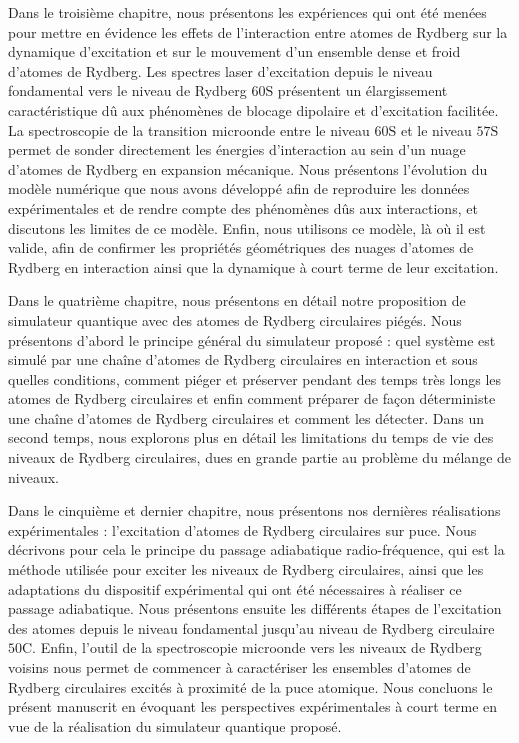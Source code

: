 Dans le troisième chapitre, nous présentons les expériences qui ont été menées pour mettre en évidence les effets de l'interaction entre atomes de Rydberg sur la dynamique d'excitation et sur le mouvement d'un ensemble dense et froid d'atomes de Rydberg.
Les spectres laser d'excitation depuis le niveau fondamental vers le niveau de Rydberg $\mathrm{60S}$ présentent un élargissement caractéristique dû aux phénomènes de blocage dipolaire et d'excitation facilitée.
La spectroscopie de la transition microonde entre le niveau $\mathrm{60S}$ et le niveau $\mathrm{57S}$ permet de sonder directement les énergies d'interaction au sein d'un nuage d'atomes de Rydberg en expansion mécanique.
Nous présentons l'évolution du modèle numérique que nous avons développé afin de reproduire les données expérimentales et de rendre compte des phénomènes dûs aux interactions, et discutons les limites de ce modèle.
Enfin, nous utilisons ce modèle, là où il est valide, afin de confirmer les propriétés géométriques des nuages d'atomes de Rydberg en interaction ainsi que la dynamique à court terme de leur excitation.

Dans le quatrième chapitre, nous présentons en détail notre proposition de simulateur quantique avec des atomes de Rydberg circulaires piégés.
Nous présentons d'abord le principe général du simulateur proposé : quel système est simulé par une chaîne d'atomes de Rydberg circulaires en interaction et sous quelles conditions, comment piéger et préserver pendant des temps très longs les atomes de Rydberg circulaires et enfin  comment préparer de façon déterministe une chaîne d'atomes de Rydberg circulaires et comment les détecter.
Dans un second temps, nous explorons plus en détail les limitations du temps de vie des niveaux de Rydberg circulaires, dues en grande partie au problème du mélange de niveaux.

Dans le cinquième et dernier chapitre, nous présentons nos dernières réalisations expérimentales : l'excitation d'atomes de Rydberg circulaires sur puce.
Nous décrivons pour cela le principe du passage adiabatique radio-fréquence, qui est la méthode utilisée pour exciter les niveaux de Rydberg circulaires, ainsi que les adaptations du dispositif expérimental qui ont été nécessaires à réaliser ce passage adiabatique.
Nous présentons ensuite les différents étapes de l'excitation des atomes depuis le niveau fondamental jusqu'au niveau de Rydberg circulaire $\mathrm{50C}$.
Enfin, l'outil de la spectroscopie microonde vers les niveaux de Rydberg voisins nous permet de commencer à caractériser les ensembles d'atomes de Rydberg circulaires excités à proximité de la puce atomique.
Nous concluons le présent manuscrit en évoquant les perspectives expérimentales à court terme en vue de la réalisation du simulateur quantique proposé.




